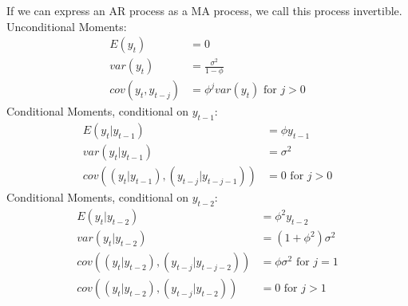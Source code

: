 \begin{enumerate}
\begin{solution}
\begin{itemize}
              \end{itemize}
              If we can express an AR process as a MA process, we call this process invertible.\\
              Unconditional Moments:
              \begin{align*}
                  E(y_t)           & = 0                                \\
                  var(y_t)         & = \frac{\sigma^2}{1-\phi}          \\
                  cov(y_t,y_{t-j}) & = \phi^j var(y_t) \text{ for } j>0
              \end{align*}
              Conditional Moments, conditional on $y_{t-1}$:
              \begin{align*}
                  E(y_t|y_{t-1})                         & = \phi y_{t-1}       \\
                  var(y_t|y_{t-1})                       & = \sigma^2           \\
                  cov((y_t|y_{t-1}),(y_{t-j}|y_{t-j-1})) & = 0 \text{ for } j>0
              \end{align*}
              Conditional Moments, conditional on $y_{t-2}$:
              \begin{align*}
                  E(y_t|y_{t-2})                         & = \phi^2 y_{t-2}                \\
                  var(y_t|y_{t-2})                       & = (1+\phi^2)\sigma^2            \\
                  cov((y_t|y_{t-2}),(y_{t-j}|y_{t-j-2})) & = \phi\sigma^2 \text{ for } j=1 \\
                  cov((y_t|y_{t-2}),(y_{t-j}|y_{t-2}))   & = 0 \text{ for } j>1
              \end{align*}


\end{solution}
\end{enumerate}
